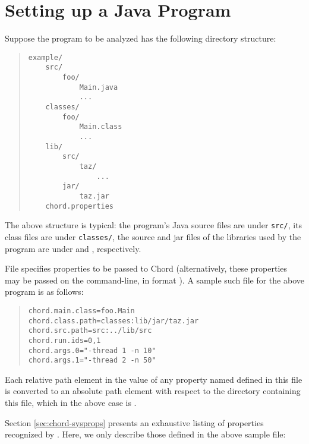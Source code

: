 \section{Setting up a Java Program}
\label{sec:program-setup}

Suppose the program to be analyzed has the following directory structure:

\begin{quote}
\begin{verbatim}
example/
    src/
        foo/
            Main.java
            ...
    classes/
        foo/
            Main.class
            ...
    lib/
        src/
            taz/
                ...
        jar/
            taz.jar
    chord.properties
\end{verbatim}
\end{quote}

\noindent The above structure is typical: the program's Java source files are under {\tt src/},
its class files are under {\tt classes/}, the source and jar files of the libraries
used by the program are under  and , respectively.

File  specifies properties to be passed to Chord (alternatively,
these properties may be passed on the command-line, in format ).
A sample such file for the above program is as follows:

\begin{quote}
\begin{verbatim}
chord.main.class=foo.Main
chord.class.path=classes:lib/jar/taz.jar
chord.src.path=src:../lib/src
chord.run.ids=0,1
chord.args.0="-thread 1 -n 10"
chord.args.1="-thread 2 -n 50"
\end{verbatim}
\end{quote}

Each relative path element in the value of any property
named  defined in this file is converted to an absolute path element with respect
to the directory containing this file, which in the above case is .

Section \ref{sec:chord-sysprops} presents an exhaustive
listing of properties recognized by \Chord.
Here, we only describe those defined in the above
sample  file:

